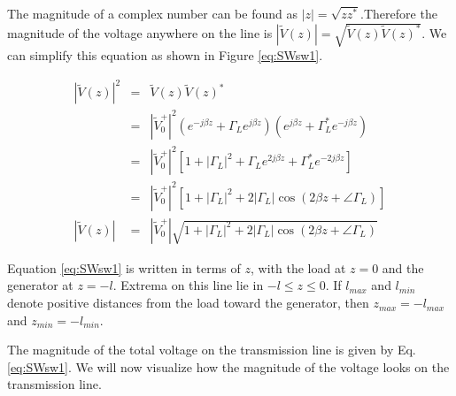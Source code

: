 \documentclass{ximera}
\begin{document}
The magnitude of a complex number can be found as $|z|=\sqrt{z
z^*}$.Therefore  the magnitude of the voltage anywhere on the line is $|\tilde{V}(z)|=\sqrt{\tilde{V}(z)
\tilde{V}(z)^*}$. We can simplify this equation as shown in Figure \ref{eq:SWsw1}.

\begin{eqnarray}
|\tilde{V}(z)|^2
&=& \tilde{V}(z)\tilde{V}(z)^* \nonumber \\
&=& |\tilde{V}_0^+|^2
(e^{-j\beta z}+\Gamma_L e^{j\beta z})
(e^{j\beta z}+\Gamma_L^*e^{-j\beta z}) \nonumber \\
&=& |\tilde{V}_0^+|^2
\left[1+|\Gamma_L|^2+\Gamma_L e^{2j\beta z}
+\Gamma_L^*e^{-2j\beta z}\right] \nonumber \\
&=& |\tilde{V}_0^+|^2
\left[1+|\Gamma_L|^2+2|\Gamma_L|
\cos(2\beta z+\angle\Gamma_L)\right] \nonumber \\
|\tilde{V}(z)|
&=& |\tilde{V}_0^+|\sqrt{1+|\Gamma_L|^2
+2|\Gamma_L|\cos(2\beta z+\angle\Gamma_L)} \label{eq:SWsw1}
\end{eqnarray}

Equation \ref{eq:SWsw1} is written in terms of $z$, with the load
at $z=0$ and the generator at $z=-l$. Extrema on this line lie in
$-l\le z\le0$. If $l_{max}$ and $l_{min}$ denote positive distances
from the load toward the generator, then $z_{max}=-l_{max}$ and
$z_{min}=-l_{min}$.

The magnitude of the total voltage on the transmission line is given
by Eq.\ref{eq:SWsw1}. We will now visualize how the magnitude of the voltage looks on the transmission line.
\end{document}
